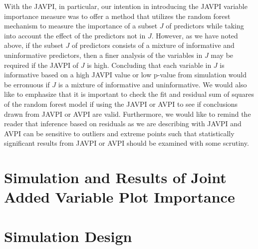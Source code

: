 \documentclass[12pt,twoside]{reedthesis}
\theoremstyle{definition}
\theoremstyle{definition}
\theoremstyle{definition}
\theoremstyle{remark}
\begin{document}
With the JAVPI, in particular, our intention in introducing the JAVPI
variable importance measure was to offer a method that utilizes the
random forest mechanism to measure the importance of a subset \(J\) of
predictors while taking into account the effect of the predictors not in
\(J\). However, as we have noted above, if the subset \(J\) of
predictors consists of a mixture of informative and uninformative
predictors, then a finer analysis of the variables in \(J\) may be
required if the JAVPI of \(J\) is high. Concluding that each variable in
\(J\) is informative based on a high JAVPI value or low p-value from
simulation would be erronuous if \(J\) is a mixture of informative and
uninformative. We would also like to emphasize that it is important to
check the fit and residual sum of squares of the random forest model if
using the JAVPI or AVPI to see if conclusions drawn from JAVPI or AVPI
are valid. Furthermore, we would like to remind the reader that
inference based on residuals as we are describing with JAVPI and AVPI
can be sensitive to outliers and extreme points such that statistically
significant results from JAVPI or AVPI should be examined with some
scrutiny. \par

\section{Simulation and Results of Joint Added Variable Plot
Importance}\label{simulation-and-results-of-joint-added-variable-plot-importance}

\section{Simulation Design}\label{simulation-design-1}
\end{document}
